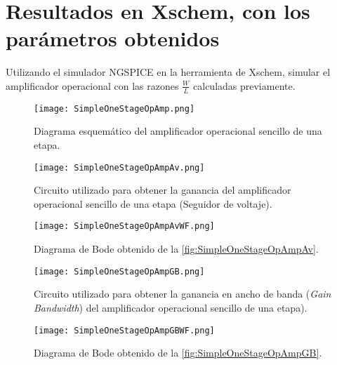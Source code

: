\section{Resultados en Xschem, con los parámetros obtenidos \label{sec:s2}}

\begin{center}
	\begin{minipage}{12cm}
		\begin{tcolorbox}[title=Actividad 2]
			Utilizando el simulador NGSPICE en la herramienta de Xschem, simular el amplificador operacional con las razones $\frac{W}{L}$ calculadas previamente.
		\end{tcolorbox}	
	\end{minipage}
\end{center}

\begin{figure}[ht]
	\centering
	\texttt{[image: SimpleOneStageOpAmp.png]}
	\caption{Diagrama esquemático del amplificador operacional sencillo de una etapa. \label{fig:SimpleOneStageOpAmp}}
\end{figure}

\begin{figure}[ht]
	\centering
	\texttt{[image: SimpleOneStageOpAmpAv.png]}
	\caption{Circuito utilizado para obtener la ganancia del amplificador operacional sencillo de una etapa (Seguidor de voltaje). \label{fig:SimpleOneStageOpAmpAv}}
\end{figure}

\begin{figure}[ht]
	\centering
	\texttt{[image: SimpleOneStageOpAmpAvWF.png]}
	\caption{Diagrama de Bode obtenido de la \autoref{fig:SimpleOneStageOpAmpAv}. \label{fig:SimpleOneStageOpAmpAvWF}}
\end{figure}

\begin{figure}[ht]
	\centering
	\texttt{[image: SimpleOneStageOpAmpGB.png]}
	\caption{Circuito utilizado para obtener la ganancia en ancho de banda (\textit{Gain Bandwidth}) del amplificador operacional sencillo de una etapa). \label{fig:SimpleOneStageOpAmpGB}}
\end{figure}

\begin{figure}[ht]
	\centering
	\texttt{[image: SimpleOneStageOpAmpGBWF.png]}
	\caption{Diagrama de Bode obtenido de la \autoref{fig:SimpleOneStageOpAmpGB}. \label{fig:SimpleOneStageOpAmpGBWF}}
\end{figure}

